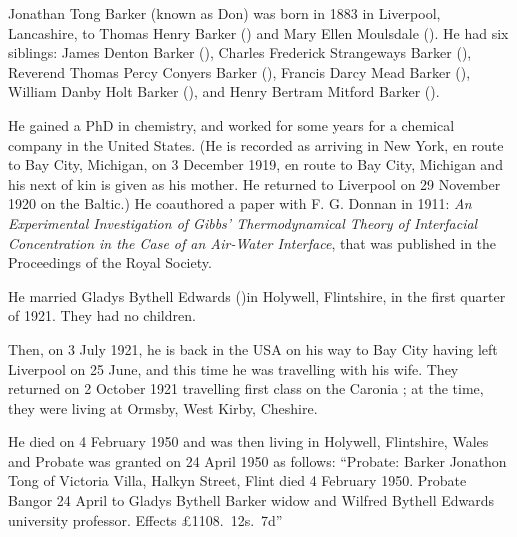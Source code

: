 
Jonathan Tong Barker (known as Don) was born in 1883 \cite{JTBarkerBirth} in Liverpool, Lancashire, to Thomas Henry Barker () and Mary Ellen Moulsdale (). He had six siblings:  James Denton Barker (), Charles Frederick Strangeways Barker (),  Reverend Thomas Percy Conyers Barker (), Francis Darcy Mead Barker (), William Danby Holt Barker (), and Henry Bertram Mitford Barker (). 

He gained a PhD in chemistry, and worked for some years for a chemical company in the United States. (He is recorded as arriving in New York, en route to Bay City, Michigan, on 3 December 1919, en route to Bay City, Michigan and his next of kin is given as his mother. He returned to Liverpool on 29 November 1920 on the Baltic.\cite{JTBarkerTravel1})
He coauthored a paper with F. G. Donnan in 1911: \emph{An Experimental Investigation of Gibbs' Thermodynamical Theory of Interfacial Concentration in the Case of an Air-Water Interface}, that was published in the Proceedings of the Royal Society.\cite{RSPA}

He married Gladys Bythell Edwards ()in Holywell, Flintshire, in the first quarter of 1921. \cite{JTBarkerMarriage} They had  no children.

Then, on 3 July 1921, he is back in the USA on his way to Bay City having left Liverpool on 25 June, and this time he was travelling with his wife. They returned on 2 October 1921 travelling first class on the Caronia \cite{JTBarkerTravel2};  at the time,  they were living at Ormsby, West Kirby, Cheshire. 

He died on 4 February 1950 and was then living in Holywell, Flintshire, Wales and Probate was granted  on 24 April 1950 as follows:
``Probate: Barker Jonathon Tong of Victoria Villa, Halkyn Street, Flint died 4 February 1950. Probate Bangor 24 April to Gladys Bythell Barker widow and Wilfred Bythell Edwards university professor. Effects \pounds1108.~12s.~7d''
